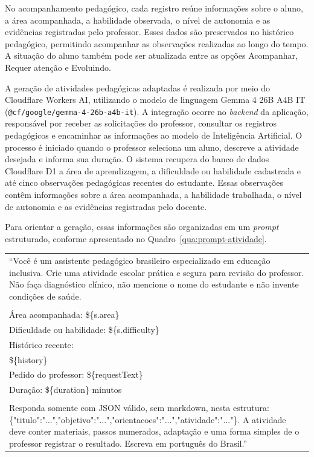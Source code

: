 No acompanhamento pedagógico, cada registro reúne informações sobre o aluno, a área acompanhada, a habilidade observada, o nível de autonomia e as evidências registradas pelo professor. Esses dados são preservados no histórico pedagógico, permitindo acompanhar as observações realizadas ao longo do tempo. A situação do aluno também pode ser atualizada entre as opções Acompanhar, Requer atenção e Evoluindo.

A geração de atividades pedagógicas adaptadas é realizada por meio do Cloudflare Workers AI, utilizando o modelo de linguagem Gemma 4 26B A4B IT (\texttt{@cf/google/gemma-4-26b-a4b-it}). A integração ocorre no \textit{backend} da aplicação, responsável por receber as solicitações do professor, consultar os registros pedagógicos e encaminhar as informações ao modelo de Inteligência Artificial. O processo é iniciado quando o professor seleciona um aluno, descreve a atividade desejada e informa sua duração. O sistema recupera do banco de dados Cloudflare D1 a área de aprendizagem, a dificuldade ou habilidade cadastrada e até cinco observações pedagógicas recentes do estudante. Essas observações contêm informações sobre a área acompanhada, a habilidade trabalhada, o nível de autonomia e as evidências registradas pelo docente.

Para orientar a geração, essas informações são organizadas em um \textit{prompt} estruturado, conforme apresentado no Quadro~\ref{qua:prompt-atividade}.

\begin{quadro}[H]
\centering
\caption{\textit{Prompt} utilizado na geração de atividades pedagógicas}
\label{qua:prompt-atividade}
\begin{tabular}{|p{14cm}|}
\hline
“Você é um assistente pedagógico brasileiro especializado em educação inclusiva. Crie uma atividade escolar prática e segura para revisão do professor. Não faça diagnóstico clínico, não mencione o nome do estudante e não invente condições de saúde. \\
\\
Área acompanhada: \$\{s.area\} \\
Dificuldade ou habilidade: \$\{s.difficulty\} \\
Histórico recente: \\
\$\{history\} \\
Pedido do professor: \$\{requestText\} \\
Duração: \$\{duration\} minutos \\
\\
Responda somente com JSON válido, sem markdown, nesta estrutura: \{"titulo":"...","objetivo":"...","orientacoes":"...","atividade":"..."\}. A atividade deve conter materiais, passos numerados, adaptação e uma forma simples de o professor registrar o resultado. Escreva em português do Brasil.” \\
\hline
\end{tabular}
\end{quadro}

